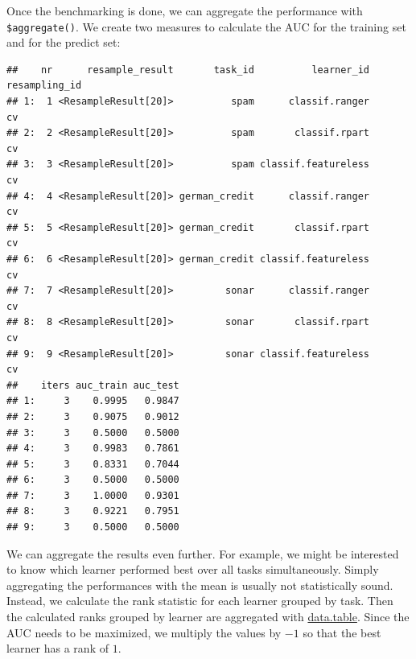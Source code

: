 \documentclass[
]{scrbook}
\newenvironment{Shaded}{\begin{snugshade}}{\end{snugshade}}
\newcommand{\AttributeTok}[1]{\textcolor[rgb]{0.77,0.63,0.00}{#1}}
\newcommand{\FunctionTok}[1]{\textcolor[rgb]{0.00,0.00,0.00}{#1}}
\newcommand{\NormalTok}[1]{#1}
\newcommand{\OtherTok}[1]{\textcolor[rgb]{0.56,0.35,0.01}{#1}}
\newcommand{\SpecialCharTok}[1]{\textcolor[rgb]{0.00,0.00,0.00}{#1}}
\newcommand{\StringTok}[1]{\textcolor[rgb]{0.31,0.60,0.02}{#1}}
\renewenvironment{Shaded} {\begin{snugshade}\small} {\end{snugshade}}
\begin{document}
Once the benchmarking is done, we can aggregate the performance with \texttt{\$aggregate()}.
We create two measures to calculate the AUC for the training set and for the predict set:

\begin{Shaded}
\end{Shaded}

\begin{verbatim}
##    nr      resample_result       task_id          learner_id resampling_id
## 1:  1 <ResampleResult[20]>          spam      classif.ranger            cv
## 2:  2 <ResampleResult[20]>          spam       classif.rpart            cv
## 3:  3 <ResampleResult[20]>          spam classif.featureless            cv
## 4:  4 <ResampleResult[20]> german_credit      classif.ranger            cv
## 5:  5 <ResampleResult[20]> german_credit       classif.rpart            cv
## 6:  6 <ResampleResult[20]> german_credit classif.featureless            cv
## 7:  7 <ResampleResult[20]>         sonar      classif.ranger            cv
## 8:  8 <ResampleResult[20]>         sonar       classif.rpart            cv
## 9:  9 <ResampleResult[20]>         sonar classif.featureless            cv
##    iters auc_train auc_test
## 1:     3    0.9995   0.9847
## 2:     3    0.9075   0.9012
## 3:     3    0.5000   0.5000
## 4:     3    0.9983   0.7861
## 5:     3    0.8331   0.7044
## 6:     3    0.5000   0.5000
## 7:     3    1.0000   0.9301
## 8:     3    0.9221   0.7951
## 9:     3    0.5000   0.5000
\end{verbatim}

We can aggregate the results even further.
For example, we might be interested to know which learner performed best over all tasks simultaneously.
Simply aggregating the performances with the mean is usually not statistically sound.
Instead, we calculate the rank statistic for each learner grouped by task.
Then the calculated ranks grouped by learner are aggregated with \href{https://cran.r-project.org/package=data.table}{data.table}.
Since the AUC needs to be maximized, we multiply the values by \(-1\) so that the best learner has a rank of \(1\).
\end{document}
